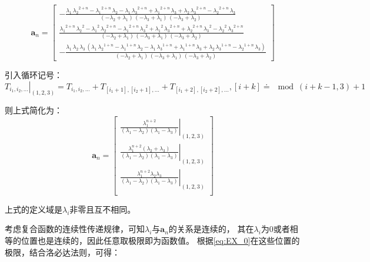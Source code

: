 \documentclass[UTF8,zihao=5]{ctexart}
\newcommand{\bm}[1]{{\mathbf{#1}}}
\begin{document}
\begin{equation}
    \bm{a}_n=
    \left[\begin{array}{c} -\frac{\lambda _{1}\,{\lambda _{2}}^{2+n}-{\lambda _{1}}^{2+n}\,\lambda _{2}-\lambda _{1}\,{\lambda _{3}}^{2+n}+{\lambda _{1}}^{2+n}\,\lambda _{3}+\lambda _{2}\,{\lambda _{3}}^{2+n}-{\lambda _{2}}^{2+n}\,\lambda _{3}}{\left(-\lambda _{2}+\lambda _{1}\right)\,\left(-\lambda _{3}+\lambda _{1}\right)\,\left(-\lambda _{3}+\lambda _{2}\right)}\\ \frac{{\lambda _{1}}^{2+n}\,{\lambda _{2}}^2-{\lambda _{1}}^2\,{\lambda _{2}}^{2+n}-{\lambda _{1}}^{2+n}\,{\lambda _{3}}^2+{\lambda _{1}}^2\,{\lambda _{3}}^{2+n}+{\lambda _{2}}^{2+n}\,{\lambda _{3}}^2-{\lambda _{2}}^2\,{\lambda _{3}}^{2+n}}{\left(-\lambda _{2}+\lambda _{1}\right)\,\left(-\lambda _{3}+\lambda _{1}\right)\,\left(-\lambda _{3}+\lambda _{2}\right)}\\ -\frac{\lambda _{1}\,\lambda _{2}\,\lambda _{3}\,\left(\lambda _{1}\,{\lambda _{2}}^{1+n}-{\lambda _{1}}^{1+n}\,\lambda _{2}-\lambda _{1}\,{\lambda _{3}}^{1+n}+{\lambda _{1}}^{1+n}\,\lambda _{3}+\lambda _{2}\,{\lambda _{3}}^{1+n}-{\lambda _{2}}^{1+n}\,\lambda _{3}\right)}{\left(-\lambda _{2}+\lambda _{1}\right)\,\left(-\lambda _{3}+\lambda _{1}\right)\,\left(-\lambda _{3}+\lambda _{2}\right)} \end{array}\right]
\end{equation}

引入循环记号：$\left.T_{i_1,i_2,...}\right|_{(1,2,3)}=T_{i_1,i_2,...}+T_{[i_1+1],[i_2+1],...}+T_{[i_1+2],[i_2+2],...}, [i+k]\doteq\mod{(i+k-1,3)}+1$

则上式简化为：
\begin{equation}
    \bm{a}_n=\begin{bmatrix}
        \left.\frac{\lambda_1^{n+2}}{(\lambda_1-\lambda_2)(\lambda_1-\lambda_3)}\right|_{(1,2,3)}\\
        \left.\frac{\lambda_1^{n+2}(\lambda_2+\lambda_3)}{(\lambda_1-\lambda_2)(\lambda_1-\lambda_3)}\right|_{(1,2,3)}\\
        \left.\frac{\lambda_1^{n+2}\lambda_2\lambda_3}{(\lambda_1-\lambda_2)(\lambda_1-\lambda_3)}\right|_{(1,2,3)}\\
    \end{bmatrix}
    \label{eq:EX_0}
\end{equation}

上式的定义域是$\lambda_i$非零且互不相同。


考虑复合函数的连续性传递规律，可知$\lambda_i$与$\bm{a}_n$的关系是连续的，
其在$\lambda_i$为0或者相等的位置也是连续的，因此任意取极限即为函数值。
根据\eqref{eq:EX_0}在这些位置的极限，结合洛必达法则，可得：
\end{document}

